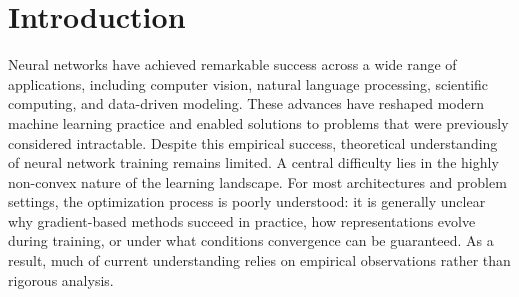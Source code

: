 \documentclass[nohyperref]{article}
\theoremstyle{plain}
\theoremstyle{definition}
\theoremstyle{remark}
\begin{document}
\section{Introduction}
\label{sec:intro}

Neural networks have achieved remarkable success across a wide range of applications, including computer vision, natural language processing, scientific computing, and data-driven modeling. These advances have reshaped modern machine learning practice and enabled solutions to problems that were previously considered intractable. Despite this empirical success, theoretical understanding of neural network training remains limited.
A central difficulty lies in the highly non-convex nature of the learning landscape. For most architectures and problem settings, the optimization process is poorly understood: it is generally unclear why gradient-based methods succeed in practice, how representations evolve during training, or under what conditions convergence can be guaranteed. As a result, much of current understanding relies on empirical observations rather than rigorous analysis.
\end{document}
